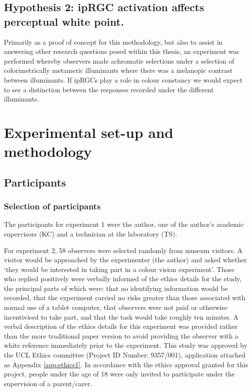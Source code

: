 \subsection*{Hypothesis 2: \gls{ipRGC} activation affects perceptual white point.}
Primarily as a proof of concept for this methodology, but also to assist in answering other research questions posed within this thesis, an experiment was performed whereby observers made achromatic selections under a selection of colorimetrically metameric illuminants where there was a melanopic contrast between illuminants.
If \glspl{ipRGC} play a role in colour constancy we would expect to see a distinction between the responses recorded under the different illuminants. 

\section{Experimental set-up and methodology}
\subsection{Participants}

\subsubsection{Selection of participants}

The participants for experiment 1 were the author, one of the author's academic supervisors (KC) and a technician at the laboratory (TS).

For experiment 2, 58 observers were selected randomly from museum visitors. A visitor would be approached by the experimenter (the author) and asked whether `they would be interested in taking part in a colour vision experiment'. Those who replied positively were verbally informed of the ethics details for the study, the principal parts of which were: that no identifying information would be recorded, that the experiment carried no risks greater than those associated with normal use of a tablet computer, that observers were not paid or otherwise incentivised to take part, and that the task would take roughly ten minutes. A verbal description of the ethics details for this experiment was provided rather than the more traditional paper version to avoid providing the observer with a white reference immediately prior to the experiment. This study was approved by the \gls{UCL} Ethics committee (Project ID Number: 9357/001), application attached as Appendix \ref{app:ethics1}. In accordance with the ethics approval granted for this project, people under the age of 18 were only invited to participate under the supervision of a parent/carer.

